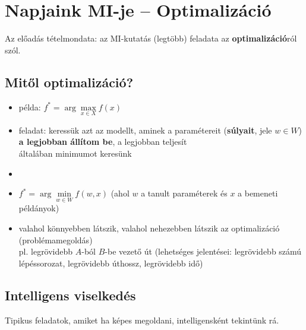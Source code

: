 \documentclass[a4paper, 11pt]{article}
\begin{document}
\newpage
	
\section{Napjaink MI-je -- Optimalizáció}

Az előadás tételmondata: az MI-kutatás (legtöbb) feladata az \textbf{optimalizáció}ról szól.
	
\subsection{Mitől optimalizáció?}
	
\begin{itemize}
	\item példa: $f^* = \arg\max\limits_{x\in X}f(x)$
	\item feladat: keressük azt az modellt, aminek a paramétereit (\textbf{súlyait}, jele $w \in W$) \textbf{a legjobban állítom be}, a legjobban teljesít \\ általában minimumot keresünk
	\item {}
	\item $\boxed{f^* = \arg\min\limits_{w \in W}^{} f(w, x)}$ (ahol $w$ a tanult paraméterek és $x$ a bemeneti példányok)
	\item valahol könnyebben látszik, valahol nehezebben látszik az optimalizáció (problémamegoldás) \\ pl. legrövidebb $A$-ból $B$-be vezető út (lehetséges jelentései: legrövidebb számú lépéssorozat, legrövidebb úthossz, legrövidebb idő)
\end{itemize}

\subsection{Intelligens viselkedés}

Tipikus feladatok, amiket ha képes megoldani, intelligensként tekintünk rá.
\end{document}
